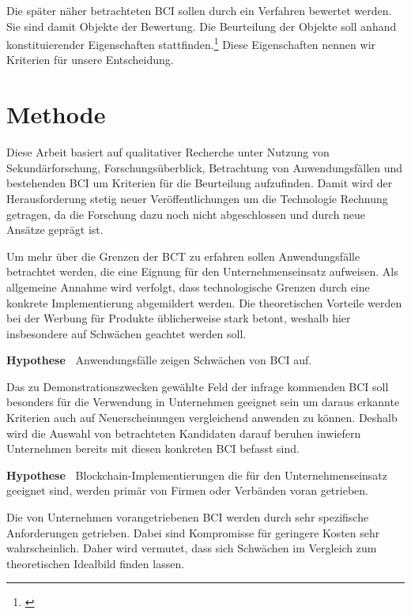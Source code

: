 Die später näher betrachteten \gls{BCI} sollen durch ein Verfahren bewertet werden.
Sie sind damit Objekte der Bewertung.
Die Beurteilung der Objekte soll anhand konstituierender Eigenschaften stattfinden.\footnote{\cite{b:strassert:entscheidungen}}
Diese Eigenschaften nennen wir Kriterien für unsere Entscheidung.

\section{Methode}

Diese Arbeit basiert auf qualitativer Recherche unter Nutzung von Sekundärforschung, Forschungsüberblick, Betrachtung von Anwendungsfällen und bestehenden \gls{BCI} um Kriterien für die Beurteilung aufzufinden.
Damit wird der Herausforderung stetig neuer Veröffentlichungen um die Technologie Rechnung getragen, da die Forschung dazu noch nicht abgeschlossen und durch neue Ansätze geprägt ist.

Um mehr über die Grenzen der \gls{BCT} zu erfahren sollen Anwendungsfälle betrachtet werden, die eine Eignung für den Unternehmenseinsatz aufweisen.
Als allgemeine Annahme wird verfolgt, dass technologische Grenzen durch eine konkrete Implementierung %
abgemildert werden.
Die theoretischen Vorteile werden bei der Werbung für Produkte üblicherweise stark betont, weshalb hier insbesondere auf Schwächen geachtet werden soll.

\textbf{Hypothese~} Anwendungsfälle zeigen Schwächen von \gls{BCI} auf.

Das zu Demonstrationszwecken gewählte Feld der infrage kommenden \gls{BCI} soll besonders für die Verwendung in Unternehmen geeignet sein um daraus erkannte Kriterien auch auf Neuerscheinungen vergleichend anwenden zu können.
Deshalb wird die Auswahl von betrachteten Kandidaten darauf beruhen inwiefern Unternehmen bereits mit diesen konkreten \gls{BCI} befasst sind.

\textbf{Hypothese~} Blockchain-Implementierungen die für den Unternehmenseinsatz geeignet sind, werden primär von Firmen oder Verbänden voran getrieben.

Die von Unternehmen vorangetriebenen \gls{BCI} werden durch sehr spezifische Anforderungen getrieben.
Dabei sind Kompromisse für geringere Kosten sehr wahrscheinlich.
Daher wird vermutet, dass sich Schwächen im Vergleich zum theoretischen Idealbild finden lassen.

